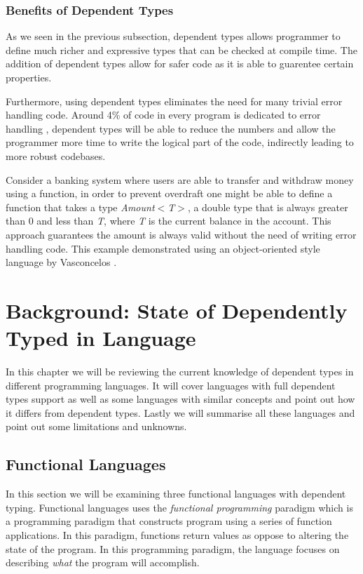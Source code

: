 \documentclass[a4paper,12pt]{report}
\begin{document}
\subsection{Benefits of Dependent Types}
As we seen in the previous subsection, dependent types allows programmer to 
define much richer and expressive types that can be checked at compile time. The 
addition of dependent types allow for safer code as it is able to guarentee certain 
properties. 

\par
Furthermore, using dependent types eliminates the need for many trivial error 
handling code. Around 4\% of code in every program is dedicated to error 
handling \cite{errorHandlingCode}, dependent types will be able to reduce the 
numbers and allow the programmer more time to write the logical part of the 
code, indirectly leading to more robust codebases.

\par
Consider a banking system where users are able to transfer and withdraw 
money using a function, 
in order to prevent overdraft one might be able to define a function that takes 
a type \textit{Amount$<$T$>$}, a double type that is always 
greater than 0 and less than \textit{T}, where \textit{T} is the current balance in the account. 
This approach guarantees the amount is always valid without the need of writing 
error handling code. This example demonstrated using an object-oriented style 
language by Vasconcelos \cite{objOritentedDependentType}.


\chapter{Background: State of Dependently Typed in Language} 
In this chapter we will be reviewing the current knowledge of dependent types 
in different programming languages. It will cover languages with full dependent 
types support as well as some languages with similar concepts and point out how 
it differs from dependent types. Lastly we will summarise all these languages 
and point out some limitations and unknowns. 

\section{Functional Languages}

In this section we will be examining three functional languages with 
dependent typing. Functional languages 
uses the \textit{functional programming} \cite{overviewFP} paradigm which is a programming 
paradigm that constructs program using a series of function applications. In 
this paradigm, functions return values as oppose to altering the state of the 
program. In this programming paradigm, the language focuses on describing 
\textit{what} the program will accomplish.
\end{document}
